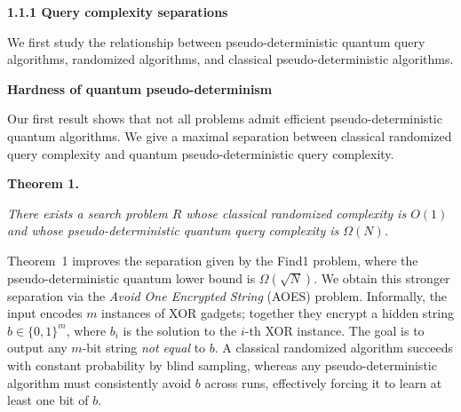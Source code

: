 \documentclass[10pt,a4paper]{article}
\begin{document}
\par\medskip\noindent\textbf{
1.1.1 Query complexity separations}\par




We first study the relationship between pseudo-deterministic quantum query algorithms, randomized algorithms, and classical pseudo-deterministic algorithms.\par




\par\medskip\noindent\textbf{Hardness of quantum pseudo-determinism}\par




Our first result shows that not all problems admit efficient pseudo-deterministic quantum algorithms. We give a maximal separation between classical randomized query complexity and quantum pseudo-deterministic query complexity.\par






\par\medskip\noindent\textbf{
\textbf{Theorem 1}\textbf{.}
}\par



\emph{There exists a search problem ${R}$ whose classical randomized complexity is $O(1)$ and whose pseudo-deterministic quantum query complexity is $\Omega(N)$.}\par







Theorem 1 improves the separation given by the Find1 problem, where the pseudo-deterministic quantum lower bound is $\Omega(\sqrt{N})$.
We obtain this stronger separation via the \emph{Avoid One Encrypted String} (AOES) problem. Informally, the input encodes $m$ instances of XOR gadgets; together they encrypt a hidden string $b\in\{0,1\}^{m}$, where $b_{i}$ is the solution to the $i$-th XOR instance. The goal is to output any $m$-bit string \emph{not equal} to $b$. A classical randomized algorithm succeeds with constant probability by blind sampling, whereas any pseudo-deterministic algorithm must consistently avoid $b$ across runs, effectively forcing it to learn at least one bit of $b$.\par
\end{document}
